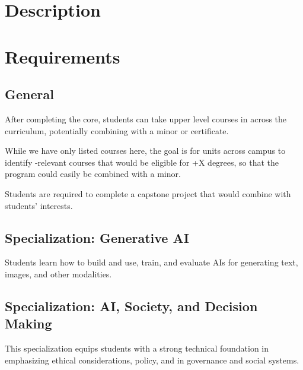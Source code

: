 \documentclass[
10pt, %
a4paper, %
oneside, %
headinclude,footinclude, %
BCOR5mm, %
]{scrartcl}
\begin{document}
\section{Description}






\section{Requirements}




\subsection{General}

After completing the core, students can take upper level courses in \ai{} across the curriculum, potentially combining with a minor or certificate.



While we have only listed  courses here, the goal is for units across campus to identify \ai{}-relevant courses that would be eligible for \ai{}+X degrees, so that the \ai{} program could easily be combined with a minor.

Students are required to complete a capstone project that would combine \ai{} with students' interests.

\subsection{Specialization: Generative AI}

    Students learn how to build and use, train, and evaluate AIs for generating text, images, and other modalities.


  

\subsection{Specialization: AI, Society, and Decision Making}

This specialization equips students with a strong technical foundation in \ai{} emphasizing ethical considerations, policy, and \ai{} in governance and social systems.


\end{document}
